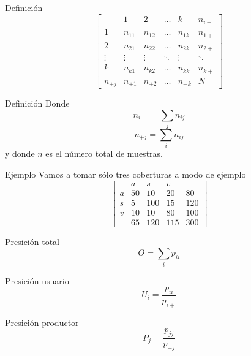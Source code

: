 \documentclass[handout]{beamer}
\begin{document}
\begin{frame}{\subsecname}
\begin{block}{Definición}
\[
\begin{bmatrix}
      & 1               & 2           &  \dots     & k      &  n_{i+}\\
    1 & n_{11}          & n_{12}      & \dots & n_{1k} &  n_{1+}\\
    2 & n_{21}          & n_{22} & \dots & n_{2k} &  n_{2+}\\
    \vdots  & \vdots & \vdots & \ddots      & \vdots         &  \ddots\\
    k & n_{k1} & n_{k2} & \dots       & n_{kk}       &  n_{k+}\\
    n_{+j} & n_{+1} & n_{+2} & \dots & n_{+k} & N
\end{bmatrix} \]
\end{block}
\end{frame}

\begin{frame}{\subsecname}
\begin{block}{Definición}
  Donde
  $$n_{i+} = \sum_j n_{ij}$$
  $$n_{+j} = \sum_i n_{ij}$$
  y donde $n$ es el número total de muestras.
\end{block}
\end{frame}

\begin{frame}{\subsecname}
  \begin{exampleblock}{Ejemplo}
    Vamos a tomar sólo tres coberturas a modo de ejemplo
    \[
    \begin{bmatrix}
          & a   & s    & v  & \\
        a & 50  & 10   & 20 & 80 \\
        s & 5   & 100  & 15 & 120 \\
        v & 10  & 10   & 80 & 100 \\
          & 65  & 120  & 115& 300
    \end{bmatrix} \]
  \end{exampleblock}
\end{frame}

\begin{frame}{\subsecname}
  \begin{block}{Presición total}
    $$O = \sum_i p_{ii}$$
  \end{block}\pause
  \begin{block}{Presición usuario}
    $$U_i = \frac{p_{ii}}{p_{i+}}$$
  \end{block}\pause
  \begin{block}{Presición productor}
    $$P_j = \frac{p_{jj}}{p_{+j}}$$
  \end{block}  \pause
\end{frame}
\end{document}

